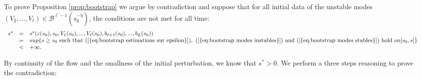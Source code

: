 \documentclass[11pt,a4paper,reqno]{amsart}
\theoremstyle{remark}
\numberwithin{equation}{section}
\begin{document}
To prove Proposition \ref{prop:bootstrap} we argue by contradiction and suppose that for all initial data of the unstable modes $(V_2,...,V_{\ell})\in \mathcal{B}^{\ell-1}(s_0^{-\tilde{\eta}})$, the conditions are not met for all time:
\begin{equation}
\begin{array}{r c l}
s^*&=& s^*(\varepsilon(s_0),s_0,V_1(s_0),...,V_{\ell}(s_0),b_{\ell+1}(s_0),...,b_L(s_0)) \\
&=& sup\{ s\geq s_0 \ \text{such} \ \text{that} \ {{\rm (\ref{{eq:bootstrap estimations sur epsilon}})}}, \  {{\rm (\ref{{eq:bootstrap modes instables}})}} \ \text{and} \ {{\rm (\ref{{eq:bootstrap modes stables}})}} \ \text{hold} \ \text{on} [s_0,s] \} \\
&<& +\infty .
\end{array}
\end{equation}

By continuity of the flow and the smallness of the initial perturbation, we know that $s^*>0$. We perform a three steps reasoning to prove the contradiction:
\end{document}
